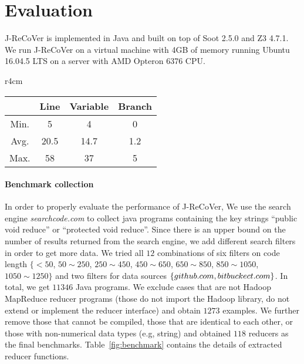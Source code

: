\documentclass{llncs}
\begin{document}
\section{Evaluation} \label{section:exp}

J-ReCoVer is implemented in Java and built on top of Soot 2.5.0 and Z3 4.7.1. We
run J-ReCoVer on a virtual machine with 4GB of memory running Ubuntu 16.04.5 LTS
on a server with AMD Opteron 6376 CPU. 

\begin{wraptable}{r}{4cm}
	\vspace{-0.7cm}
	\caption{Size of the reducers.}
	\begin{tabular}{|c|c|c|c|}
		\hline
		& Line & Variable & Branch\\
		\hline
		Min. & 5 & 4 & 0\\
		Avg. & 20.5 & 14.7 & 1.2\\
		Max. & 58 & 37 & 5\\
		\hline
	\end{tabular}
	\label{fig:benchmark}
	\vspace{-0.5cm}
\end{wraptable} 

\paragraph*{Benchmark collection} 

In order to properly evaluate the performance
of J-ReCoVer, We use the search engine \emph{searchcode.com} to collect java
programs containing the key strings ``public void reduce'' or ``protected void
reduce''. Since there is an upper bound on the number of results returned from
the search engine, we add different search filters in order to get more data. We
tried all $12$ combinations of six filters on code length $\{<50$, $ 50\sim
250$, $250\sim 450$, $450\sim 650$, $650\sim 850$, $850\sim 1050$, $1050\sim
1250\}$ and two filters for data sources $\{github.com,
bitbuckect.com\}$. In total, we get $11346$ Java programs. We exclude
cases that are not Hadoop MapReduce reducer programs (those do not import the
Hadoop library, do not extend or implement the reducer interface) and obtain
$1273$ examples. We further remove those that cannot be compiled, those that are
identical to each other, or those with non-numerical data types (e.g, string)
and obtained $118$ reducers as the final benchmarks. Table~\ref{fig:benchmark}
contains the details of extracted reducer functions.
\end{document}
